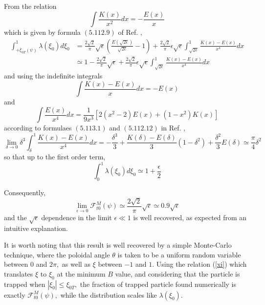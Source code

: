 From the relation
\begin{equation}
\int\frac{K\left( x\right) }{x^{2}}dx=-\frac{E\left( x\right) }{x}
\end{equation}
which is given by formula $\left( 5.112.9\right) $ of Ref. \cite{gra65},
\begin{align}
\int_{+\xi_{0T}\left( \psi\right) }^{1}\lambda\left( \xi_{0}\right) d\xi_{0}
& =\frac{2\sqrt{2}}{\pi}\sqrt{\epsilon}\left( \frac{E\left( \sqrt{2\epsilon}
\right) }{\sqrt{2\epsilon}}-1\right) +\frac{2\sqrt{2}}{\pi }\epsilon\sqrt{
\epsilon}\int_{\sqrt{2\epsilon}}^{1}\frac{K\left( x\right) -E\left( x\right)
}{x^{4}}dx  \nonumber \\
& \simeq1-\frac{2\sqrt{2}}{\pi}\sqrt{\epsilon}+\frac{2\sqrt{2}}{\pi}\epsilon%
\sqrt{\epsilon}\int_{\sqrt{2\epsilon}}^{1}\frac{K\left( x\right) -E\left(
x\right) }{x^{4}}dx
\end{align}
and using the indefinite integrals
\begin{equation}
\int\frac{K\left( x\right) -E\left( x\right) }{x}dx=-E\left( x\right)
\end{equation}
and
\begin{equation}
\int\frac{E\left( x\right) }{x^{4}}dx=\frac{1}{9x^{3}}\left[
2(x^{2}-2)E\left( x\right) +\left( 1-x^{2}\right) K\left( x\right) \right]
\end{equation}
according to formulaes $(5.113.1)$ and $\left( 5.112.12\right) $ in Ref.
\cite{gra65},
\begin{equation}
\lim_{\delta\rightarrow0}\delta^{3}\int_{\delta}^{1}\frac{K\left( x\right)
-E\left( x\right) }{x^{4}}dx=-\frac{\delta^{3}}{3}+\frac{K\left(
\delta\right) -E\left( \delta\right) }{3}\left( 1-\delta^{2}\right) +\frac{
\delta^{2}}{3}E\left( \delta\right) \simeq\frac{\pi}{4}\delta^{2}
\end{equation}
so that up to the first order term,
\begin{equation}
\int_{0}^{1}\lambda\left( \xi_{0}\right) d\xi_{0}\simeq1+\frac{\epsilon}{2}
\end{equation}

Consequently,
\begin{equation}
\lim_{\epsilon\rightarrow0}\mathcal{F}_{t0}^{M}\left( \psi\right) \simeq%
\frac{2\sqrt{2}}{\pi}\sqrt{\epsilon}\simeq0.9\sqrt{\epsilon}
\end{equation}
and the $\sqrt{\epsilon}$ dependence in the limit $\epsilon\ll1$ is well
recovered, as expected from an intuitive explanation.

It is worth noting that this result is well recovered by a simple
Monte-Carlo technique, where the poloidal angle $\theta$ is taken to be a
uniform random variable between $0$ and $2\pi,$ as well as $\xi$ between $-1$
and $1$. Using the relation (\ref{xi}) which translates $\xi$ to $\xi_{0}$
at the minimum $B$ value, and considering that the particle is trapped when $%
\left| \xi _{0}\right| \leq\xi_{0T},$ the fraction of trapped particle found
numerically is exactly $\mathcal{F}_{t0}^{M}\left( \psi\right) ,$ while the
distribution scales like $\lambda\left( \xi_{0}\right) .$

